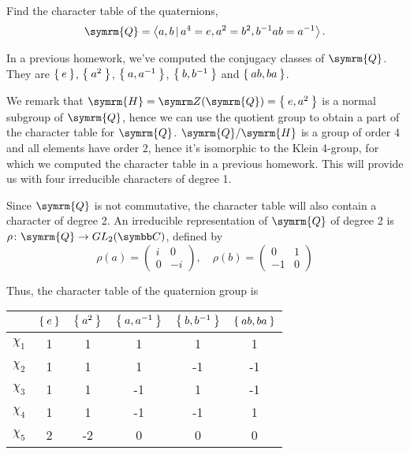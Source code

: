\begin{exercise}
Find the character table of the quaternions,
\[
    \symrm{Q} = \generatedby{ a, b \vbar a^4 = e, a^2 = b^2, b^{-1} a b = a^{-1} }.
\]
\end{exercise}
\begin{solution}
In a previous homework, we've computed the conjugacy classes of \(\symrm{Q}\). They are \(\Set{e}\), \(\Set{a^2}\), \(\Set{a, a^{-1}}\), \(\Set{b, b^{-1}}\) and \(\Set{ab, ba}\).

We remark that \(\symrm{H} = \centerofgroup(\symrm{Q}) = \Set{e, a^2}\) is a normal subgroup of \(\symrm{Q}\), hence we can use the quotient group to obtain a part of the character table for \(\symrm{Q}\). \(\symrm{Q} / \symrm{H}\) is a group of order 4 and all elements have order 2, hence it's isomorphic to the Klein 4-group, for which we computed the character table in a previous homework. This will provide us with four irreducible characters of degree 1.

Since \(\symrm{Q}\) is not commutative, the character table will also contain a character of degree 2. An irreducible representation of \(\symrm{Q}\) of degree 2 is \(\rho \colon \symrm{Q} \to GL_2(\complex)\), defined by
\[
    \rho(a) = \begin{pmatrix}
        i & 0 \\
        0 & -i
    \end{pmatrix},
    \quad
    \rho(b) = \begin{pmatrix}
        0 & 1 \\
        -1 & 0
    \end{pmatrix}
\]

Thus, the character table of the quaternion group is
\begin{center}
    \begin{tabular}{c|c|c|c|c|c}
        & \(\Set{e}\) & \(\Set{a^2}\) & \(\Set{a, a^{-1}}\) & \(\Set{b, b^{-1}}\) & \(\Set{ab, ba}\) \\
        \hline
        \(\chi_1\) & 1 & 1 & 1 & 1 & 1 \\
        \hline
        \(\chi_2\) & 1 & 1 & 1 & -1 & -1 \\
        \hline
        \(\chi_3\) & 1 & 1 & -1 & 1 & -1 \\
        \hline
        \(\chi_4\) & 1 & 1 & -1 & -1 & 1\\
        \hline
        \(\chi_5\) & 2 & -2 & 0 & 0 & 0
    \end{tabular}
\end{center}
\end{solution}

